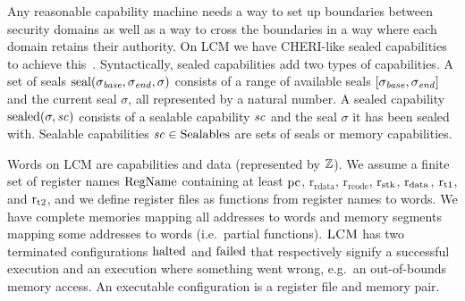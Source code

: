 \documentclass[acmsmall,review,anonymous]{acmart}\settopmatter{printfolios=true,printccs=false,printacmref=false}
\renewcommand{\RegName}{\shareddom{RegName}}
\renewcommand{\SealableCaps}{\shareddom{Sealables}}
\renewcommand{\rretc}{\mathrm{r}_{\mathrm{rcode}}}
\renewcommand{\rretd}{\mathrm{r}_{\mathrm{rdata}}}
\newcommand{\trgcm}{\textsc{LCM}}
\begin{document}

Any reasonable capability machine needs a way to set up boundaries between security domains as well as a way to cross the boundaries in a way where each domain retains their authority.
On \trgcm{} we have CHERI-like sealed capabilities to achieve this~\cite{watson_cheri:_2015}.
Syntactically, sealed capabilities add two types of capabilities.
A set of seals $\mathrm{seal}(\sigma_{\mathit{base}},\sigma_{\mathit{end}},\sigma)$ consists of a range of available seals $[\sigma_{\mathit{base}},\sigma_{\mathit{end}}]$ and the current seal $\sigma$, all represented by a natural number.
A sealed capability $\mathrm{sealed}(\sigma,\mathit{sc})$ consists of a sealable capability $\mathit{sc}$ and the seal $\sigma$ it has been sealed with.
Sealable capabilities $\vsc \in \SealableCaps$ are sets of seals or memory capabilities.

Words on \trgcm{} are capabilities and data (represented by $\mathbb{Z}$).
We assume a finite set of register names $\RegName$ containing at least $\mathrm{pc}$, $\rretd$, $\rretc$, $\mathrm{r}_\mathrm{stk}$, $\mathrm{r}_\mathrm{data}$, $\mathrm{r}_\mathrm{t1}$, and $\mathrm{r}_\mathrm{t2}$, and we define register files as functions from register names to words.
We have complete memories mapping all addresses to words and memory segments mapping some addresses to words (i.e.\ partial functions).
$\trgcm{}$ has two terminated configurations $\mathrm{halted}$ and $\mathrm{failed}$ that respectively signify a successful execution and an execution where something went wrong, e.g.\ an out-of-bounds memory access.
An executable configuration is a register file and memory pair.
\end{document}
